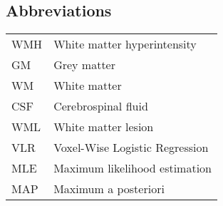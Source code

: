 \begin{singlespacing}
\tableofcontents
\newpage
\subsection*{Abbreviations}
\begin{table}[H]
  \begin{tabu} to \textwidth{lX[l]}\hline
    WMH    & White matter hyperintensity \\
    GM     & Grey matter \\
    WM     & White matter \\
    CSF    & Cerebrospinal fluid \\
    WML    & White matter lesion \\
    VLR    & Voxel-Wise Logistic Regression \\
    MLE    & Maximum likelihood estimation \\
    MAP    & Maximum a posteriori \\
    \hline
  \end{tabu}
\end{table}
\end{singlespacing}
